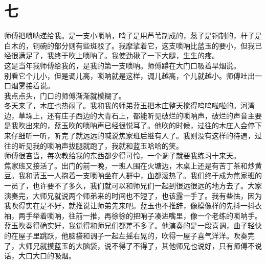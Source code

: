 \fancyhead[RO]{\thepage} %
\fancyhead[LE]{\thepage} %
\fancyfoot[LE,RO]{}
\fancyfoot[LO,CE]{}
\fancyfoot[CO,RE]{}
\chapter*{七}
师傅把唢呐递给我。是一支小唢呐，哨子是用芦苇制成的，蕊子是铜制的，杆子是白木的，铜碗的部分则有些斑驳了。我摩挲着它，这支唢呐比蓝玉的要小，但我已经很满足了，我终于吹上唢呐了。我使劲揪了一下大腿，生生的疼。
\\

这是当年我师傅给我的，是我的第一支唢呐。师傅蹲在大门口吸着旱烟说。
\\

别看它个儿小，但是调儿高，唢呐就是这样，调儿越高，个儿就越小。师傅吐出一口烟雾接着说。
\\

我点点头，门口的师傅渐渐就模糊了。
\\

冬天来了，木庄也热闹了。我和我的师弟蓝玉把木庄整天搅得呜呜啦啦的。河湾边，草垛上，还有庄子西边的大青石上，都能听见破烂的唢呐声，破烂的声音主要是我吹出来的，蓝玉吹的唢呐声已经很悦耳了。他吹的时候，过往的木庄人会停下来仔细听一听，听完了就远远的喊说焦家班后继有人了。我则没有这样的待遇，过往的听见我的唢呐声拔腿就跑了，我就和蓝玉哈哈的笑。
\\

师傅很吝啬，每次教给我的东西都少得可怜，一个调子就要我练习十来天。
\\

焦家班又接活了。出门的前一晚，一班人围在火塘边，木桌上还是有苦丁茶和炒黄豆。我和蓝玉一人抱着一支唢呐坐在人群中，血都滚热了。我们终于成为焦家班的一员了，也许要不了多久，我们就可以和师兄们一起到很远很远的地方去了。大家演奏完，大师兄就说两个师弟来的时间也不短了，也该露一手了。我有些怯，因为我吹得实在是不好，就推说让师弟先来吧。蓝玉也不推辞，像模像样的先抖一抖衣袖，两手举着唢呐，往前一推，再徐徐的把哨子凑进嘴里，像一个老练的唢呐手。蓝玉吹奏得确实好，我觉得和师兄们都差不多了。他演奏的是一段喜调，曲子轻快的在屋子里跳跃，他脑袋和调子一起左摇右晃的，吹得一屋子喜气洋洋。吹奏完了，大师兄就摸蓝玉的大脑袋，说不得了不得了，其他师兄也说好，只有师傅不说话，大口大口的吸烟。
\\

